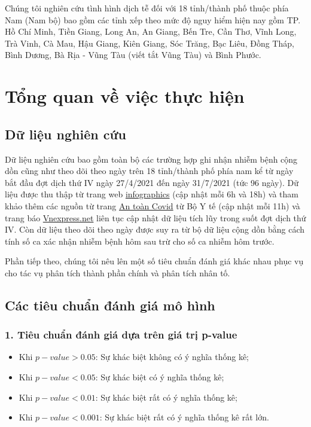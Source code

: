 \documentclass[../thesis.tex]{subfiles}
\begin{document}
Chúng tôi nghiên cứu tình hình dịch tễ đối với 18 tỉnh/thành phố thuộc phía Nam (Nam bộ) bao gồm các tỉnh xếp theo mức độ nguy hiểm hiện nay gồm TP. Hồ Chí Minh, Tiền Giang, Long An, An Giang, Bến Tre, Cần Thơ, Vĩnh Long, Trà Vinh, Cà Mau, Hậu Giang, Kiên Giang, Sóc Trăng, Bạc Liêu, Đồng Tháp, Bình Dương, Bà Rịa - Vũng Tàu (viết tắt Vũng Tàu) và Bình Phước.

\section{Tổng quan về việc thực hiện}

\subsection{Dữ liệu nghiên cứu}

Dữ liệu nghiên cứu bao gồm toàn bộ các trường hợp ghi nhận nhiễm bệnh cộng dồn cũng như theo dõi theo ngày trên 18 tỉnh/thành phố phía nam kể từ ngày bắt đầu đợt dịch thứ IV ngày 27/4/2021 đến ngày 31/7/2021 (tức 96 ngày). Dữ liệu được thu thập từ trang web \href{https://infographics.vn/interactive-du-lieu-dot-dich-covid-19-thu-4-tai-viet-nam-lien-tuc-cap-nhat/20981.vna}{infographics} (cập nhật mỗi 6h và 18h) và tham khảo thêm các nguồn từ trang \href{https://nguyco.antoancovid.vn}{An toàn Covid} từ Bộ Y tế (cập nhật mỗi 11h) và trang báo \href{https://vnexpress.net/covid-19/covid-19-viet-nam}{Vnexpress.net} liên tục cập nhật dữ liệu tích lũy trong suốt đợt dịch thứ IV. Còn dữ liệu theo dõi theo ngày được suy ra từ bộ dữ liệu cộng dồn bằng cách tính số ca xác nhận nhiễm bệnh hôm sau trừ cho số ca nhiễm hôm trước.

Phần tiếp theo, chúng tôi nêu lên một số tiêu chuẩn đánh giá khác nhau phục vụ cho tác vụ phân tích thành phần chính và phân tích nhân tố.

\subsection{Các tiêu chuẩn đánh giá mô hình}

\subsubsection{1. Tiêu chuẩn đánh giá dựa trên giá trị p-value} 
	\begin{itemize}
		\item Khi $ p-value > 0.05 $: Sự khác biệt không có ý nghĩa thống kê; 
		\item Khi $ p-value < 0.05 $: Sự khác biệt có ý nghĩa thống kê; 
		\item Khi $ p-value < 0.01 $: Sự khác biệt rất có ý nghĩa thống kê; 
		\item Khi $ p-value < 0.001 $: Sự khác biệt rất có ý nghĩa thống kê rất lớn.
	\end{itemize}
\end{document}
